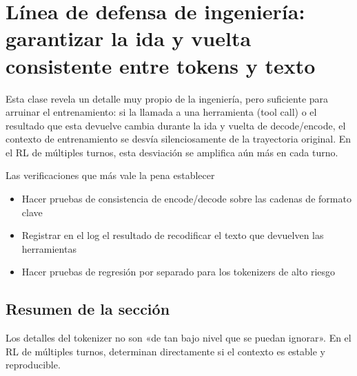 \section{Línea de defensa de ingeniería: garantizar la ida y vuelta consistente entre tokens y texto}
Esta clase revela un detalle muy propio de la ingeniería, pero suficiente para arruinar el entrenamiento: si la llamada a una herramienta (tool call) o el resultado que esta devuelve cambia durante la ida y vuelta de decode/encode, el contexto de entrenamiento se desvía silenciosamente de la trayectoria original. En el RL de múltiples turnos, esta desviación se amplifica aún más en cada turno.

\begin{warningbox}{Las verificaciones que más vale la pena establecer}
\begin{itemize}
  \item Hacer pruebas de consistencia de encode/decode sobre las cadenas de formato clave
  \item Registrar en el log el resultado de recodificar el texto que devuelven las herramientas
  \item Hacer pruebas de regresión por separado para los tokenizers de alto riesgo
\end{itemize}
\end{warningbox}

\subsection{Resumen de la sección}
Los detalles del tokenizer no son «de tan bajo nivel que se puedan ignorar». En el RL de múltiples turnos, determinan directamente si el contexto es estable y reproducible.

\newpage
